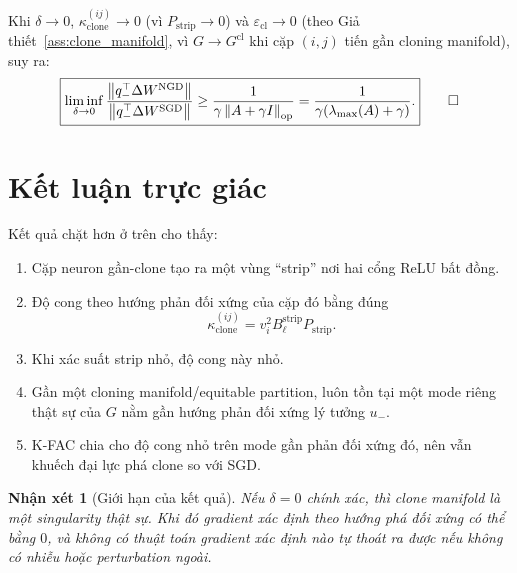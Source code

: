 \documentclass[11pt,a4paper]{article}
\newtheorem{remark}{Nhận xét}
\newcommand{\norm}[1]{\left\lVert #1 \right\rVert}
\DeclareMathOperator{\op}{op}
\begin{document}
Khi $\delta \to 0$, $\kappa_{\mathrm{clone}}^{(ij)} \to 0$ (vì $P_{\mathrm{strip}} \to 0$) và $\varepsilon_{\mathrm{cl}} \to 0$
(theo Giả thiết~\ref{ass:clone_manifold}, vì $G \to G^{\mathrm{cl}}$ khi cặp $(i,j)$ tiến gần cloning manifold), suy ra:
\[
\boxed{
\liminf_{\delta \to 0}
\frac{\norm{q_-^\top \Delta W^{\mathrm{NGD}}}}
{\norm{q_-^\top \Delta W^{\mathrm{SGD}}}}
\ge
\frac{1}{\gamma \norm{A+\gamma I}_{\op}}
=
\frac{1}{\gamma(\lambda_{\max}(A)+\gamma)}.
}\qed
\]

\section{Kết luận trực giác}

Kết quả chặt hơn ở trên cho thấy:
\begin{enumerate}
    \item Cặp neuron gần-clone tạo ra một vùng ``strip'' nơi hai cổng ReLU bất
    đồng.
    \item Độ cong theo hướng phản đối xứng của cặp đó bằng đúng
    \[
    \kappa_{\mathrm{clone}}^{(ij)} = v_i^2 B_\ell^{\mathrm{strip}} P_{\mathrm{strip}}.
    \]
    \item Khi xác suất strip nhỏ, độ cong này nhỏ.
    \item Gần một cloning manifold/equitable partition, luôn tồn tại một mode
    riêng thật sự của $G$ nằm gần hướng phản đối xứng lý tưởng $u_-$.
    \item K-FAC chia cho độ cong nhỏ trên mode gần phản đối xứng đó, nên vẫn
    khuếch đại lực phá clone so với SGD.
\end{enumerate}

\begin{remark}[Giới hạn của kết quả]
Nếu $\delta = 0$ chính xác, thì clone manifold là một singularity thật sự. Khi đó
gradient xác định theo hướng phá đối xứng có thể bằng $0$, và không có thuật toán
gradient xác định nào tự thoát ra được nếu không có nhiễu hoặc perturbation ngoài.
\end{remark}
\end{document}

